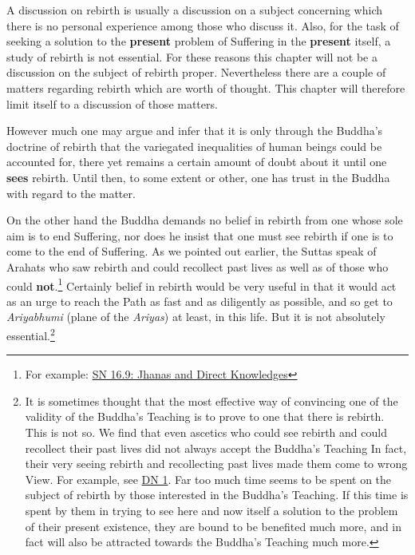 A discussion on rebirth is usually a discussion on a subject concerning which there is no personal experience among those who discuss it. Also, for the task of seeking a solution to the \textbf{present} problem of Suffering in the \textbf{present} itself, a study of rebirth is not essential. For these reasons this chapter will not be a discussion on the subject of rebirth proper. Nevertheless there are a couple of matters regarding rebirth which are worth of thought. This chapter will therefore limit itself to a discussion of those matters.

However much one may argue and infer that it is only through the Buddha's doctrine of rebirth that the variegated inequalities of human beings could be accounted for, there yet remains a certain amount of doubt about it until one \textbf{sees} rebirth. Until then, to some extent or other, one has trust in the Buddha with regard to the matter.

On the other hand the Buddha demands no belief in rebirth from one whose sole aim is to end Suffering, nor does he insist that one must see rebirth if one is to come to the end of Suffering. As we pointed out earlier, the Suttas speak of Arahats who saw rebirth and could recollect past lives as well as of those who could \textbf{not}.\footnote{For example: \href{https://suttacentral.net/sn16.9/en/bodhi}{SN 16.9: Jhanas and Direct Knowledges}} Certainly belief in rebirth would be very useful in that it would act as an urge to reach the Path as fast and as diligently as possible, and so get to \emph{Ariyabhumi} (plane of the \emph{Ariyas}) at least, in this life. But it is not absolutely essential.\footnote{It is sometimes thought that the most effective way of convincing one of the validity of the Buddha's Teaching is to prove to one that there is rebirth. This is not so. We find that even ascetics who could see rebirth and could recollect their past lives did not always accept the Buddha's Teaching In fact, their very seeing rebirth and recollecting past lives made them come to wrong View. For example, see \href{https://suttacentral.net/dn1/en/bodhi}{DN 1}. Far too much time seems to be spent on the subject of rebirth by those interested in the Buddha's Teaching. If this time is spent by them in trying to see here and now itself a solution to the problem of their present existence, they are bound to be benefited much more, and in fact will also be attracted towards the Buddha's Teaching much more.}

